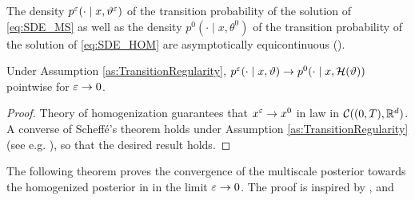 \documentclass[10pt]{article}
\begin{document}
\begin{assumption}\label{as:TransitionRegularity} The density $p^\varepsilon(\cdot \mid x, \vartheta^\varepsilon)$ of the transition probability of the solution of \eqref{eq:SDE_MS} as well as the density $p^0(\cdot \mid x, \theta^0)$ of the transition probability of the solution of \eqref{eq:SDE_HOM} are asymptotically equicontinuous ().
\end{assumption}

\begin{lemma}\label{lem:TransitionConvergence} Under Assumption \ref{as:TransitionRegularity}, $p^\varepsilon(\cdot \mid x, \vartheta) \to p^0(\cdot \mid x, \mathcal H(\vartheta))$ pointwise for $\varepsilon \to 0$.
\end{lemma}
\begin{proof} Theory of homogenization guarantees that $x^\varepsilon \to x^0$ in law in $\mathcal C((0, T), \mathbb{R}^d)$. A converse of Scheffé's theorem holds under Assumption \ref{as:TransitionRegularity} (see e.g. \cite{Swe86, Boo85}), so that the desired result holds.
\end{proof}

The following theorem proves the convergence of the multiscale posterior towards the homogenized posterior in in the limit $\varepsilon \to 0$. The proof is inspired by \cite[Proposition 4.6]{Stu10}, \cite[Theorem 3.1]{LST18} and \cite[Theorem 5]{AbD18}
\end{document}
